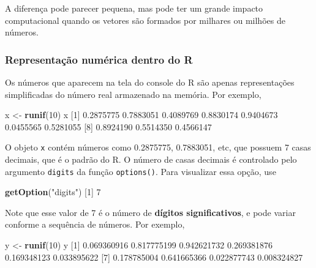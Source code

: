 \documentclass[10pt,a4paper]{book}
\newenvironment{Shaded}{\begin{snugshade}}{\end{snugshade}}
\newcommand{\KeywordTok}[1]{\textcolor[rgb]{0.13,0.29,0.53}{\textbf{#1}}}
\newcommand{\DecValTok}[1]{\textcolor[rgb]{0.00,0.00,0.81}{#1}}
\newcommand{\FloatTok}[1]{\textcolor[rgb]{0.00,0.00,0.81}{#1}}
\newcommand{\StringTok}[1]{\textcolor[rgb]{0.31,0.60,0.02}{#1}}
\newcommand{\NormalTok}[1]{#1}
\begin{document}
A diferença pode parecer pequena, mas pode ter um grande impacto
computacional quando os vetores são formados por milhares ou milhões de
números.

\subsubsection{Representação numérica dentro do
R}\label{representauxe7uxe3o-numuxe9rica-dentro-do-r}

Os números que aparecem na tela do console do R são apenas
representações simplificadas do número real armazenado na memória. Por
exemplo,

\begin{Shaded}
\begin{Highlighting}[]
\NormalTok{x <-}\StringTok{ }\KeywordTok{runif}\NormalTok{(}\DecValTok{10}\NormalTok{)}
\NormalTok{x}
\NormalTok{ [}\DecValTok{1}\NormalTok{] }\FloatTok{0.2875775} \FloatTok{0.7883051} \FloatTok{0.4089769} \FloatTok{0.8830174} \FloatTok{0.9404673} \FloatTok{0.0455565} \FloatTok{0.5281055}
\NormalTok{ [}\DecValTok{8}\NormalTok{] }\FloatTok{0.8924190} \FloatTok{0.5514350} \FloatTok{0.4566147}
\end{Highlighting}
\end{Shaded}

O objeto \texttt{x} contém números como 0.2875775, 0.7883051, etc, que
possuem 7 casas decimais, que é o padrão do R. O número de casas
decimais é controlado pelo argumento \texttt{digits} da função
\texttt{options()}. Para visualizar essa opção, use

\begin{Shaded}
\begin{Highlighting}[]
\KeywordTok{getOption}\NormalTok{(}\StringTok{"digits"}\NormalTok{)}
\NormalTok{[}\DecValTok{1}\NormalTok{] }\DecValTok{7}
\end{Highlighting}
\end{Shaded}

Note que esse valor de 7 é o número de \textbf{dígitos significativos},
e pode variar conforme a sequência de números. Por exemplo,

\begin{Shaded}
\begin{Highlighting}[]
\NormalTok{y <-}\StringTok{ }\KeywordTok{runif}\NormalTok{(}\DecValTok{10}\NormalTok{)}
\NormalTok{y}
\NormalTok{ [}\DecValTok{1}\NormalTok{] }\FloatTok{0.069360916} \FloatTok{0.817775199} \FloatTok{0.942621732} \FloatTok{0.269381876} \FloatTok{0.169348123} \FloatTok{0.033895622}
\NormalTok{ [}\DecValTok{7}\NormalTok{] }\FloatTok{0.178785004} \FloatTok{0.641665366} \FloatTok{0.022877743} \FloatTok{0.008324827}
\end{Highlighting}
\end{Shaded}
\end{document}
